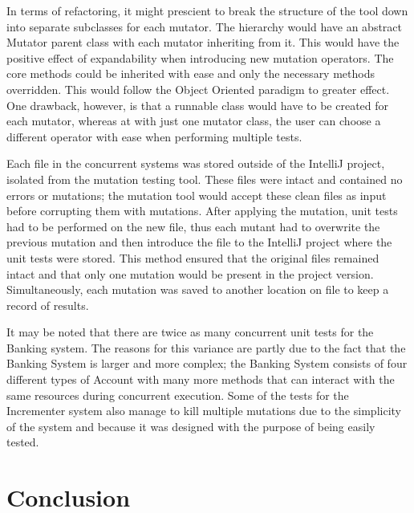 \documentclass[a4paper,12pt]{article}
\begin{document}
In terms of refactoring, it might prescient to break the structure of the tool down into separate subclasses for each mutator. The hierarchy would have an abstract Mutator parent class with each mutator inheriting from it. This would have the positive effect of expandability when introducing new mutation operators. The core methods could be inherited with ease and only the necessary methods overridden. This would follow the Object Oriented paradigm to greater effect. One drawback, however, is that a runnable class would have to be created for each mutator, whereas at with just one mutator class, the user can choose a different operator with ease when performing multiple tests.

Each file in the concurrent systems was stored outside of the IntelliJ project, isolated from the mutation testing tool. These files were intact and contained no errors or mutations; the mutation tool would accept these clean files as input before corrupting them with mutations. After applying the mutation, unit tests had to be performed on the new file, thus each mutant had to overwrite the previous mutation and then introduce the file to the IntelliJ project where the unit tests were stored. This method ensured that the original files remained intact and that only one mutation would be present in the project version. Simultaneously, each mutation was saved to another location on file to keep a record of results. 

It may be noted that there are twice as many concurrent unit tests for the Banking system. The reasons for this variance are partly due to the fact that the Banking System is larger and more complex; the Banking System consists of four different types of Account with many more methods that can interact with the same resources during concurrent execution. Some of the tests for the Incrementer system also manage to kill multiple mutations due to the simplicity of the system and because it was designed with the purpose of being easily tested.   

    
    
\newpage	
\section{Conclusion}
\end{document}
